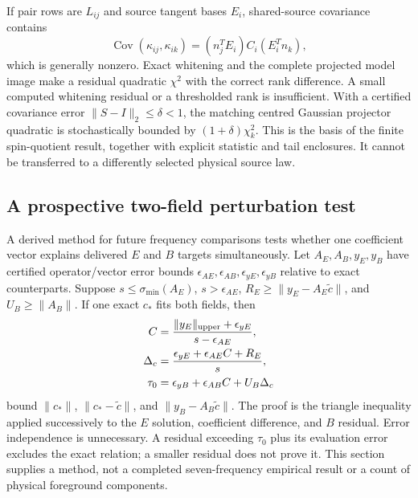 If pair rows are $L_{ij}$ and source tangent bases $E_i$, shared-source covariance contains
\begin{equation}
 \operatorname{Cov}(\kappa_{ij},\kappa_{ik})
 =(n_j^TE_i)C_i(E_i^Tn_k),
\end{equation}
which is generally nonzero. Exact whitening and the complete projected model image make a residual quadratic $\chi^2$ with the correct rank difference. A small computed whitening residual or a thresholded rank is insufficient. With a certified covariance error $\|S-I\|_2\leq\delta<1$, the matching centred Gaussian projector quadratic is stochastically bounded by $(1+\delta)\chi^2_k$. This is the basis of the finite spin-quotient result, together with explicit statistic and tail enclosures. It cannot be transferred to a differently selected physical source law.

\subsection{A prospective two-field perturbation test}

A derived method for future frequency comparisons tests whether one coefficient vector explains delivered $E$ and $B$ targets simultaneously. Let $A_E,A_B,y_E,y_B$ have certified operator/vector error bounds $\epsilon_{AE},\epsilon_{AB},\epsilon_{yE},\epsilon_{yB}$ relative to exact counterparts. Suppose $s\leq\sigma_{\min}(A_E)$, $s>\epsilon_{AE}$, $R_E\geq\|y_E-A_E\tilde c\|$, and $U_B\geq\|A_B\|$. If one exact $c_*$ fits both fields, then
\begin{align}
 C&=\frac{\|y_E\|_{\rm upper}+\epsilon_{yE}}{s-\epsilon_{AE}},\nonumber\\
 \Delta_c&=\frac{\epsilon_{yE}+\epsilon_{AE}C+R_E}{s},\nonumber\\
 \tau_0&=\epsilon_{yB}+\epsilon_{AB}C+U_B\Delta_c
\end{align}
bound $\|c_*\|$, $\|c_*-\tilde c\|$, and $\|y_B-A_B\tilde c\|$. The proof is the triangle inequality applied successively to the $E$ solution, coefficient difference, and $B$ residual. Error independence is unnecessary. A residual exceeding $\tau_0$ plus its evaluation error excludes the exact relation; a smaller residual does not prove it. This section supplies a method, not a completed seven-frequency empirical result or a count of physical foreground components.
